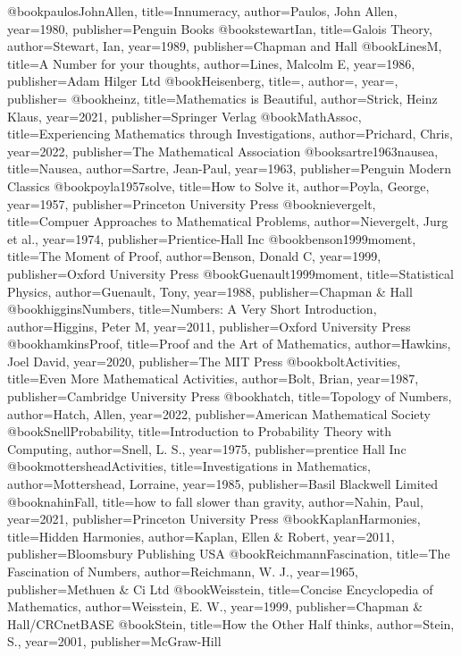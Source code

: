 @book{paulosJohnAllen,
  title={Innumeracy},
  author={Paulos, John Allen},
  year={1980},
  publisher={Penguin Books}
}
@book{stewartIan,
  title={Galois Theory},
  author={Stewart, Ian},
  year={1989},
  publisher={Chapman and Hall}
}
@book{LinesM,
  title={A Number for your thoughts},
  author={Lines, Malcolm E},
  year={1986},
  publisher={Adam Hilger Ltd}
}
@book{Heisenberg,
  title={},
  author={},
  year={},
  publisher={}
}
@book{heinz,
  title={Mathematics is Beautiful},
  author={Strick, Heinz Klaus},
  year={2021},
  publisher={Springer Verlag}
}
@book{MathAssoc,
  title={Experiencing Mathematics through Investigations},
  author={Prichard, Chris},
  year={2022},
  publisher={The Mathematical Association}
}
@book{sartre1963nausea,
  title={Nausea},
  author={Sartre, Jean-Paul},
  year={1963},
  publisher={Penguin Modern Classics}
}
@book{poyla1957solve,
  title={How to Solve it},
  author={Poyla, George},
  year={1957},
  publisher={Princeton University Press}
}
@book{nievergelt,
  title={Compuer Approaches to Mathematical Problems},
  author={Nievergelt, Jurg et al.},
  year={1974},
  publisher={Prientice-Hall Inc}
}
@book{benson1999moment,
  title={The Moment of Proof},
  author={Benson, Donald C},
  year={1999},
  publisher={Oxford University Press}
}
@book{Guenault1999moment,
  title={Statistical Physics},
  author={Guenault, Tony},
  year={1988},
  publisher={Chapman \& Hall}
}
@book{higginsNumbers,
  title={Numbers: A Very Short Introduction},
  author={Higgins, Peter M},
  year={2011},
  publisher={Oxford University Press}
}
@book{hamkinsProof,
  title={Proof and the Art of Mathematics},
  author={Hawkins, Joel David},
  year={2020},
  publisher={The MIT Press}
}
@book{boltActivities,
  title={Even More Mathematical Activities},
  author={Bolt, Brian},
  year={1987},
  publisher={Cambridge University Press}
}
@book{hatch,
  title={Topology of Numbers},
  author={Hatch, Allen},
  year={2022},
  publisher={American Mathematical Society}
}
@book{SnellProbability,
  title={Introduction to Probability Theory with Computing},
  author={Snell, L. S.},
  year={1975},
  publisher={prentice Hall Inc}
}
@book{mottersheadActivities,
  title={Investigations in Mathematics},
  author={Mottershead, Lorraine},
  year={1985},
  publisher={Basil Blackwell Limited}
}
@book{nahinFall,
  title={how to fall slower than gravity},
  author={Nahin, Paul},
  year={2021},
  publisher={Princeton University Press}
}
@book{KaplanHarmonies,
  title={Hidden Harmonies},
  author={Kaplan, Ellen \& Robert},
  year={2011},
  publisher={Bloomsbury Publishing USA}
}
@book{ReichmannFascination,
  title={The Fascination of Numbers},
  author={Reichmann, W. J.},
  year={1965},
  publisher={Methuen \& Ci Ltd}
}
@book{Weisstein,
  title={Concise Encyclopedia of Mathematics},
  author={Weisstein, E. W.},
  year={1999},
  publisher={Chapman \& Hall/CRCnetBASE}
}
@book{Stein,
  title={How the Other Half thinks},
  author={Stein, S.},
  year={2001},
  publisher={McGraw-Hill}
}

